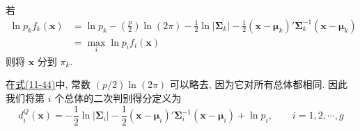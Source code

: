 若
\label{eq:11-44}
\begin{equation}
\begin{aligned}
\ln p_kf_k(\mathbf{x})&=\ln p_k-\left(\frac{p}{2}\right)\ln(2\pi)-\frac{1}{2}\ln|\boldsymbol{\Sigma}_k|-\frac{1}{2}(\mathbf{x}-\boldsymbol{\mu}_k)'\boldsymbol{\Sigma}_k^{-1}(\mathbf{x}-\boldsymbol{\mu}_k)\\
&=\max_i\ln p_if_i(\mathbf{x})
\end{aligned}
\tag{11-44}
\end{equation}
则将 $\mathbf{x}$ 分到 $\pi_k$.

在\hyperref[eq:11-44]{式(11-44)}中, 常数 $(p/2)\ln(2\pi)$ 可以略去, 因为它对所有总体都相同. 因此我们将第 $i$ 个总体的二次判别得分定义为
\label{eq:11-45}
\begin{equation}
d_i^Q(\mathbf{x})=-\frac{1}{2}\ln|\boldsymbol{\Sigma}_i|-\frac{1}{2}(\mathbf{x}-\boldsymbol{\mu}_i)'\boldsymbol{\Sigma}_i^{-1}(\mathbf{x}-\boldsymbol{\mu}_i)+\ln p_i,\qquad i=1,2,\cdots,g
\tag{11-45}
\end{equation}
